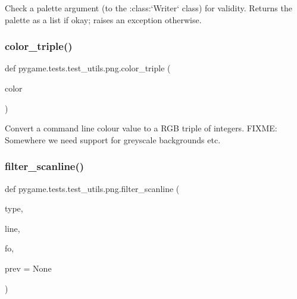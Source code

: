 \begin{DoxyVerb}Check a palette argument (to the :class:`Writer` class) for validity.
Returns the palette as a list if okay; raises an exception otherwise.
\end{DoxyVerb}
 \mbox{\label{namespacepygame_1_1tests_1_1test__utils_1_1png_a5af064ebde1023f999865fd5472ec43f}} 
\subsubsection{\texorpdfstring{color\+\_\+triple()}{color\_triple()}}
{\footnotesize\ttfamily def pygame.\+tests.\+test\+\_\+utils.\+png.\+color\+\_\+triple (\begin{DoxyParamCaption}\item[{}]{color }\end{DoxyParamCaption})}

\begin{DoxyVerb}Convert a command line colour value to a RGB triple of integers.
FIXME: Somewhere we need support for greyscale backgrounds etc.
\end{DoxyVerb}
 \mbox{\label{namespacepygame_1_1tests_1_1test__utils_1_1png_a5ad54e74f0175e63c06f3522f5e7056d}} 
\subsubsection{\texorpdfstring{filter\+\_\+scanline()}{filter\_scanline()}}
{\footnotesize\ttfamily def pygame.\+tests.\+test\+\_\+utils.\+png.\+filter\+\_\+scanline (\begin{DoxyParamCaption}\item[{}]{type,  }\item[{}]{line,  }\item[{}]{fo,  }\item[{}]{prev = {\ttfamily None} }\end{DoxyParamCaption})}

